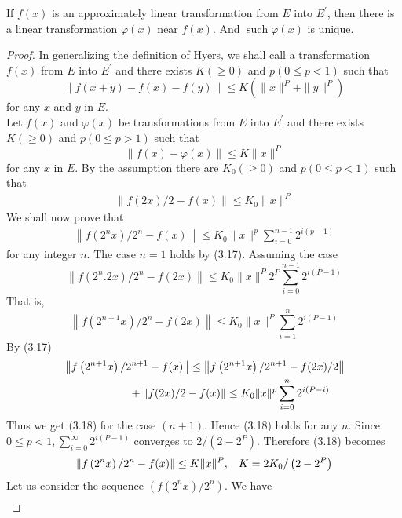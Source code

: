 \documentclass[a4paper,12pt]{report}
\begin{document}
\begin{thm}
If $f(x)$ is an approximately linear transformation from $E$ into $E^{\prime}$, then there is a linear transformation $\varphi(x)$ near $f(x)$. And $\operatorname{such} \varphi(x)$ is unique.
\begin{proof}
In generalizing the definition of Hyers, we shall call a \linebreak transformation $f(x)$ from $E$ into $E^{\prime}$ and there exists $K(\geq 0)$ and $p(0 \le p<1)$ such that
$$
\|f(x+y)-f(x)-f(y)\| \le K\left(\|x\|^{P}+\|y\|^{P}\right)
$$
for any $x$ and $y$ in $E$. \\
\indent Let $f(x)$ and $\varphi(x)$ be transformations from $E$ into $E^{\prime}$ and there exists $K(\geq 0)$ and $p(0 \le p>1)$ such that
$$
\|f(x)-\varphi(x)\| \le K\|x\|^{P}
$$
for any $x$ in $E$.
By the assumption there are $K_{0}(\geq 0)$ \linebreak and $p(0 \le p<1)$ such that
\begin{eqnarray}
\|f(2 x) / 2-f(x)\| \le K_{0}\|x\|^{P}
\end{eqnarray}
We shall now prove that
\begin{eqnarray}
\left\|f\left(2^{n} x\right) / 2^{n}-f(x)\right\| \le K_{0}\|x\|^{p} \sum_{i=0}^{n-1} 2^{i(p-1)}
\end{eqnarray}
for any integer $n$. The case $n=1$ holds by (3.17). Assuming the case
$$
\left\|f\left(2^{n} .2 x\right) / 2^{n}-f(2 x)\right\| \le K_{0}\|x\|^{P} 2^{P} \sum_{i=0}^{n-1} 2^{i(P-1)}
$$
That is,
$$
\left\|f\left(2^{n+1} x\right) / 2^{n}-f(2 x)\right\| \le K_{0}\|x\|^{P} \sum_{i=1}^{n} 2^{i(P-1)}
$$
By (3.17)
$$
\begin{aligned}
	& \left\|f\left(2^{n+1} x\right) / 2^{n+1}-f(x)\right\| \le\left\|f\left(2^{n+1} x\right) / 2^{n+1}-f(2 x) / 2\right\| \\
	& \indent \indent \indent \indent +\|f(2 x) / 2-f(x)\| \leq K_{0}\|x\|^{p} \sum_{i=0}^{n} 2^{i(P-i)}
\end{aligned}
$$
Thus we get (3.18) for the case $(n+1)$. Hence (3.18) holds for any $n$.
Since $0 \le p<1, \sum_{i=0}^{\infty} 2^{i(P-1)}$ converges to $2 /\left(2-2^{P}\right)$. Therefore (3.18) becomes
\begin{eqnarray}
\left\|f\left(2^{n} x\right) / 2^{n}-f(x)\right\| \le K\|x\|^{P}, \hspace{0.3cm} K=2 K_{0} /\left(2-2^{P}\right)
\end{eqnarray}
Let us consider the sequence $\left(f\left(2^{n} x\right) / 2^{n}\right)$. We have
$$
\begin{aligned}

\end{aligned}$$
\end{proof}
\end{thm}
\end{document}
